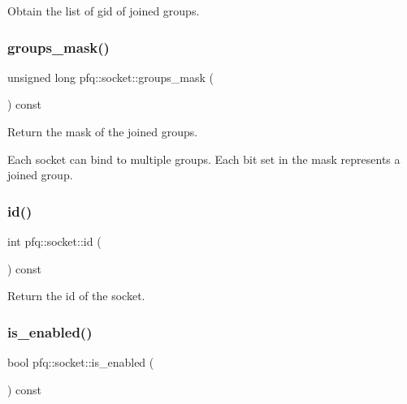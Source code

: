 Obtain the list of gid of joined groups. 

\mbox{\label{classpfq_1_1socket_a136c71dc2292218fe43246770cf109da}} 
\subsubsection{\texorpdfstring{groups\+\_\+mask()}{groups\_mask()}}
{\footnotesize\ttfamily unsigned long pfq\+::socket\+::groups\+\_\+mask (\begin{DoxyParamCaption}{ }\end{DoxyParamCaption}) const\hspace{0.3cm}{\ttfamily [inline]}}



Return the mask of the joined groups. 

Each socket can bind to multiple groups. Each bit set in the mask represents a joined group. \mbox{\label{classpfq_1_1socket_a78e4376b28f6eef5b126018197522d30}} 
\subsubsection{\texorpdfstring{id()}{id()}}
{\footnotesize\ttfamily int pfq\+::socket\+::id (\begin{DoxyParamCaption}{ }\end{DoxyParamCaption}) const\hspace{0.3cm}{\ttfamily [inline]}}



Return the id of the socket. 

\mbox{\label{classpfq_1_1socket_af414e42b71611f6c8ed44c9e7f57ff41}} 
\subsubsection{\texorpdfstring{is\+\_\+enabled()}{is\_enabled()}}
{\footnotesize\ttfamily bool pfq\+::socket\+::is\+\_\+enabled (\begin{DoxyParamCaption}{ }\end{DoxyParamCaption}) const\hspace{0.3cm}{\ttfamily [inline]}}




